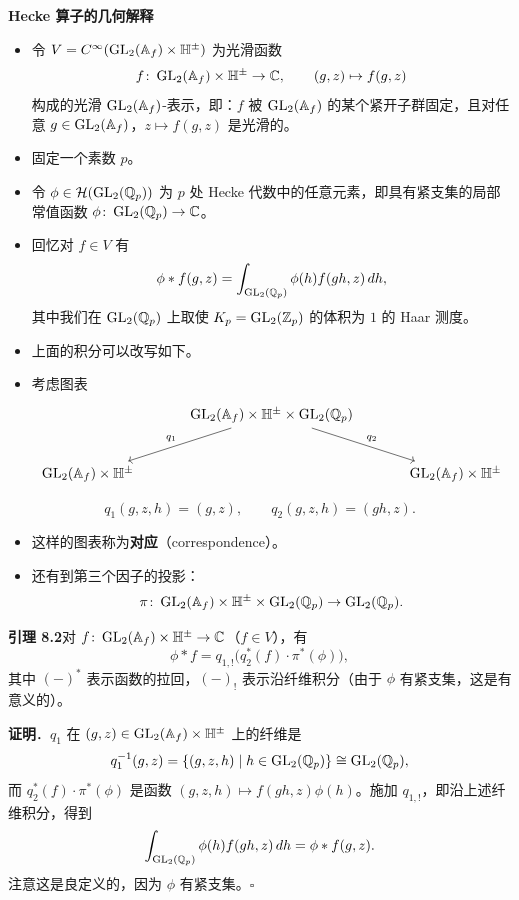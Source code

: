 \medskip
\noindent\textbf{Hecke 算子的几何解释}
\begin{itemize}
\item 令 $V=C^\infty(\operatorname{GL}_2(\mathbb{A}_f)\times\mathbb{H}^\pm)$ 为光滑函数
\[
f\colon\operatorname{GL}_2(\mathbb{A}_f)\times\mathbb{H}^\pm\to\mathbb{C},\qquad (g,z)\mapsto f(g,z)
\]
构成的光滑 $\operatorname{GL}_2(\mathbb{A}_f)$-表示，即：$f$ 被 $\operatorname{GL}_2(\mathbb{A}_f)$ 的某个紧开子群固定，且对任意 $g\in\operatorname{GL}_2(\mathbb{A}_f)$，$z\mapsto f(g,z)$ 是光滑的。
\item 固定一个素数 $p$。
\item 令 $\phi\in\mathcal{H}(\operatorname{GL}_2(\mathbb{Q}_p))$ 为 $p$ 处 Hecke 代数中的任意元素，即具有紧支集的局部常值函数 $\phi\colon\operatorname{GL}_2(\mathbb{Q}_p)\to\mathbb{C}$。
\item 回忆对 $f\in V$ 有
\[
\phi*f(g,z)=\int_{\operatorname{GL}_2(\mathbb{Q}_p)}\phi(h)f(gh,z)\,dh,
\]
其中我们在 $\operatorname{GL}_2(\mathbb{Q}_p)$ 上取使 $K_p=\operatorname{GL}_2(\mathbb{Z}_p)$ 的体积为 $1$ 的 Haar 测度。
\item 上面的积分可以改写如下。
\item 考虑图表
\[
\begin{tikzcd}[column sep=3.2em, row sep=2.4em]
& \GL_2(\Af)\times\HH^{\pm}\times\GL_2(\Q_p)\arrow[dl,"q_1"']\arrow[dr,"q_2"] &\\
\GL_2(\Af)\times\HH^{\pm} & & \GL_2(\Af)\times\HH^{\pm}
\end{tikzcd}
\]
\end{itemize}

\[
q_1(g,z,h)=(g,z),\qquad q_2(g,z,h)=(gh,z).
\]
\begin{itemize}
\item 这样的图表称为\textbf{对应}（correspondence）。
\item 还有到第三个因子的投影：
\[
\pi\colon\operatorname{GL}_2(\mathbb{A}_f)\times\mathbb{H}^\pm\times\operatorname{GL}_2(\mathbb{Q}_p)\to\operatorname{GL}_2(\mathbb{Q}_p).
\]
\end{itemize}

\noindent\textbf{引理 8.2}\label{lem:8.2}\quad 对 $f\colon\operatorname{GL}_2(\mathbb{A}_f)\times\mathbb{H}^\pm\to\mathbb{C}$（$f\in V$），有
\[
\phi*f=q_{1,!}\bigl(q_2^*(f)\cdot\pi^*(\phi)\bigr),
\]
其中 $(-)^*$ 表示函数的拉回，$(-)_!$ 表示沿纤维积分（由于 $\phi$ 有紧支集，这是有意义的）。

\noindent\textbf{证明}．$q_1$ 在 $(g,z)\in\operatorname{GL}_2(\mathbb{A}_f)\times\mathbb{H}^\pm$ 上的纤维是
\[
q_1^{-1}(g,z)=\{(g,z,h)\mid h\in\operatorname{GL}_2(\mathbb{Q}_p)\}\cong\operatorname{GL}_2(\mathbb{Q}_p),
\]
而 $q_2^*(f)\cdot\pi^*(\phi)$ 是函数 $(g,z,h)\mapsto f(gh,z)\phi(h)$。施加 $q_{1,!}$，即沿上述纤维积分，得到
\[
\int_{\operatorname{GL}_2(\mathbb{Q}_p)}\phi(h)f(gh,z)\,dh=\phi*f(g,z).
\]
注意这是良定义的，因为 $\phi$ 有紧支集。\hfill$\square$

